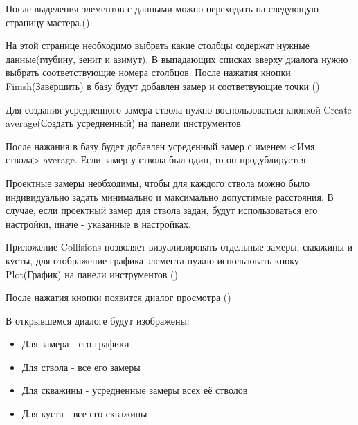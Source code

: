 
После выделения элементов с данными можно переходить на следующую страницу мастера.()


На этой странице необходимо выбрать какие столбцы содержат нужные данные(глубину, зенит и азимут). В выпадающих списках вверху диалога нужно выбрать соответствующие номера столбцов.
После нажатия кнопки Finish(Завершить) в базу будут добавлен замер и соответвующие точки ()


Для создания усредненного замера ствола нужно воспользоваться кнопкой Create average(Создать усредненный) на панели инструментов


После нажания в базу будет добавлен усреденный замер с именем <Имя ствола>-average. Если замер у ствола был один, то он продублируется.

Проектные замеры необходимы, чтобы для каждого ствола можно было индивидуально задать минимально и максимально допустимые расстояния.
В случае, если проектный замер для ствола задан, будут использоваться его настройки, иначе - указанные в настройках.

Приложение Collisions позволяет визуализировать отдельные замеры, скважины и кусты, для отображение графика элемента нужно использовать кноку Plot(График) на панели инструментов
()


После нажатия кнопки появится диалог просмотра ()


В открывшемся диалоге будут изображены:
\begin{itemize}
  \item Для замера - его графики
  \item Для ствола - все его замеры
  \item Для скважины - усредненные замеры всех её стволов
  \item Для куста - все его скважины
\end{itemize}

